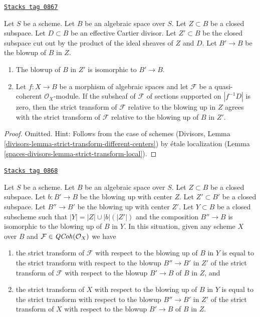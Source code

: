 \begin{lemma}
\label{spaces-divisors-lemma-strict-transform-different-centers}
\href{https://stacks.math.columbia.edu/tag/0867}{\texttt{Stacks tag 0867}}

Let $S$ be a scheme. Let $B$ be an algebraic space over $S$.
Let $Z \subset B$ be a closed subspace.
Let $D \subset B$ be an effective Cartier divisor.
Let $Z' \subset B$ be the closed subspace cut out by the product
of the ideal sheaves of $Z$ and $D$.
Let $B' \to B$ be the blowup of $B$ in $Z$.
\begin{enumerate}
\item The blowup of $B$ in $Z'$ is isomorphic to $B' \to B$.
\item Let $f : X \to B$ be a morphism of algebraic spaces and let $\mathcal{F}$
be a quasi-coherent $\mathcal{O}_X$-module. If the subsheaf of $\mathcal{F}$ of
sections supported on $|f^{-1}D|$ is zero, then the
strict transform of $\mathcal{F}$ relative to the blowing up
in $Z$ agrees with the strict transform of $\mathcal{F}$ relative
to the blowing up of $B$ in $Z'$.
\end{enumerate}
\end{lemma}

\begin{proof}
Omitted. Hint: Follows from the case of schemes
(Divisors, Lemma \ref{divisors-lemma-strict-transform-different-centers})
by \'etale localization (Lemma \ref{spaces-divisors-lemma-strict-transform-local}).
\end{proof}

\begin{lemma}
\label{spaces-divisors-lemma-strict-transform-composition-blowups}
\href{https://stacks.math.columbia.edu/tag/0868}{\texttt{Stacks tag 0868}}

Let $S$ be a scheme. Let $B$ be an algebraic space over $S$.
Let $Z \subset B$ be a closed subspace.
Let $b : B' \to B$ be the blowing up with center $Z$.
Let $Z' \subset B'$ be a closed subspace.
Let $B'' \to B'$ be the blowing up with center $Z'$.
Let $Y \subset B$ be a closed subscheme such that
$|Y| = |Z| \cup |b|(|Z'|)$ and the composition $B'' \to B$
is isomorphic to the blowing up of $B$ in $Y$.
In this situation, given any scheme $X$ over $B$ and
$\mathcal{F} \in \mathit{QCoh}(\mathcal{O}_X)$ we have
\begin{enumerate}
\item the strict transform of $\mathcal{F}$ with respect to the blowing
up of $B$ in $Y$ is equal to the strict transform with respect to the
blowup $B'' \to B'$ in $Z'$ of the strict transform of $\mathcal{F}$
with respect to the blowup $B' \to B$ of $B$ in $Z$, and
\item the strict transform of $X$ with respect to the blowing
up of $B$ in $Y$ is equal to the strict transform with respect to the
blowup $B'' \to B'$ in $Z'$ of the strict transform of $X$
with respect to the blowup $B' \to B$ of $B$ in $Z$.
\end{enumerate}
\end{lemma}

